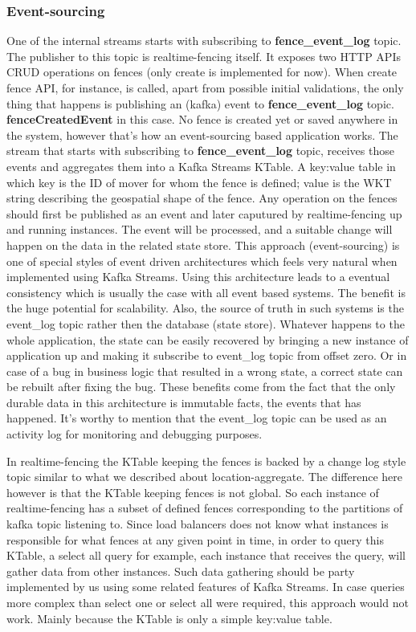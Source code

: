 \documentclass[a4]{report}
\begin{document}
    \subsubsection{Event-sourcing}
    One of the internal streams starts with subscribing to \textbf{fence\_event\_log} topic.
    The publisher to this topic is realtime-fencing itself.
    It exposes two HTTP APIs CRUD operations on fences (only create is implemented for now).
    When create fence API, for instance, is called, apart from possible initial validations, the
    only thing that happens is publishing an (kafka) event to \textbf{fence\_event\_log} topic.
    \textbf{fenceCreatedEvent} in this case.
    No fence is created yet or saved anywhere in the system, however that's how an event-sourcing based application
    works.
    The stream that starts with subscribing to \textbf{fence\_event\_log} topic, receives those events and aggregates
    them into a Kafka Streams KTable.
    A key:value table in which key is the ID of mover for whom the fence is defined;
    value is the WKT string describing the geospatial shape of the fence.
    Any operation on the fences should first be published as an event and later caputured by realtime-fencing up and
    running instances.
    The event will be processed, and a suitable change will happen on the data in the related state store.
    This approach (event-sourcing) is one of special styles of event driven architectures which feels very natural
    when implemented using Kafka Streams.
    Using this architecture leads to a eventual consistency which is usually the case with all event based systems.
    The benefit is the huge potential for scalability.
    Also, the source of truth in such systems is the event\_log topic rather then the database (state store).
    Whatever happens to the whole application, the state can be easily recovered by bringing a new instance of
    application up and making it subscribe to event\_log topic from offset zero.
    Or in case of a bug in business logic that resulted in a wrong state, a correct state can be rebuilt after fixing
    the bug.
    These benefits come from the fact that the only durable data in this architecture is immutable facts, the
    events that has happened.
    It's worthy to mention that the event\_log topic can be used as an activity log for monitoring and debugging purposes.

    In realtime-fencing the KTable keeping the fences is backed by a change log style topic similar to what we
    described about location-aggregate.
    The difference here however is that the KTable keeping fences is not global.
    So each instance of realtime-fencing has a subset of defined fences corresponding to the partitions of
    kafka topic listening to.
    Since load balancers does not know what instances is responsible for what fences at any given point in time, in
    order to query this KTable, a select all query for example, each instance that receives the query, will gather
    data from other instances.
    Such data gathering should be party implemented by us using some related features of Kafka Streams.
    In case queries more complex than select one or select all were required, this approach would not work.
    Mainly because the KTable is only a simple key:value table.
\end{document}

